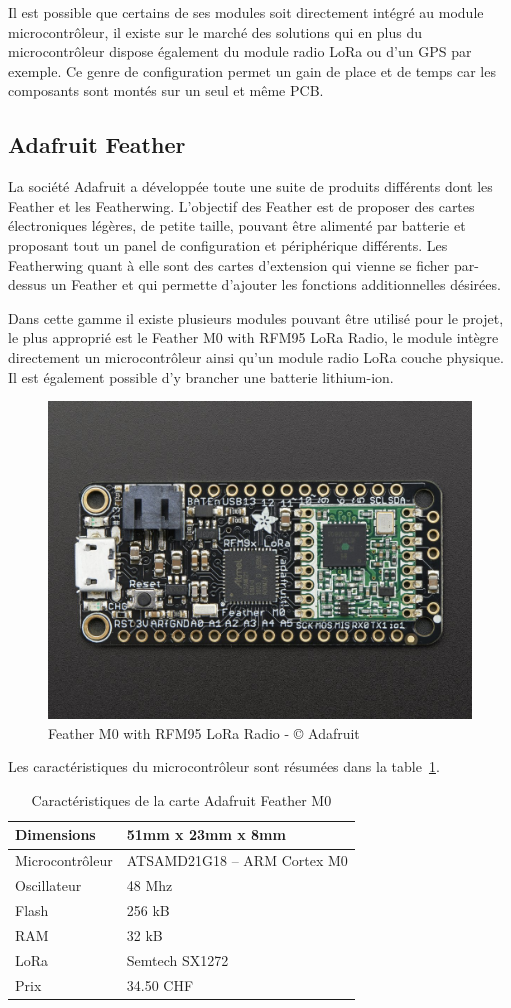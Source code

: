 Il est possible que certains de ses modules soit directement intégré au module microcontrôleur, il existe sur le marché des solutions qui en plus du microcontrôleur dispose également du module radio LoRa ou d’un GPS par exemple. Ce genre de configuration permet un gain de place et de temps car les composants sont montés sur un seul et même PCB.

\subsection{Adafruit Feather}

La société Adafruit a développée toute une suite de produits différents dont les Feather et les Featherwing. L’objectif des Feather est de proposer des cartes électroniques légères, de petite taille, pouvant être alimenté par batterie et proposant tout un panel de configuration et périphérique différents. Les Featherwing quant à elle sont des cartes d’extension qui vienne se ficher par-dessus un Feather et qui permette d’ajouter les fonctions additionnelles désirées.

Dans cette gamme il existe plusieurs modules pouvant être utilisé pour le projet, le plus approprié est le Feather M0 with RFM95 LoRa Radio, le module intègre directement un microcontrôleur ainsi qu’un module radio LoRa couche physique. Il est également possible d’y brancher une batterie lithium-ion.

\begin{figure}[htb]
\centering 
\includegraphics[width=0.4\columnwidth]{../images/adafruit-feather-m0-lora.jpg} 
\caption[Adafruit Feather]{Feather M0 with RFM95 LoRa Radio - © Adafruit}
\label{fig:ada_feather}
\end{figure}

Les caractéristiques du microcontrôleur sont résumées dans la table~\ref{tab:ada_feather_cara}.

\begin{table}[htb]
\caption[Adafruit Feather Caractéristiques]{Caractéristiques de la carte Adafruit Feather M0}
\label{tab:ada_feather_cara}
\centering
\begin{tabular}{ l | l }
\toprule
Dimensions & 51mm x 23mm x 8mm \\
\midrule
Microcontrôleur & ATSAMD21G18 – ARM Cortex M0 \\
\midrule
Oscillateur & 48 Mhz \\
\midrule
Flash & 256 kB \\
\midrule
RAM & 32 kB \\
\midrule
LoRa & Semtech SX1272 \\
\midrule
Prix & 34.50 CHF\\
\bottomrule 
\end{tabular}
\end{table}

